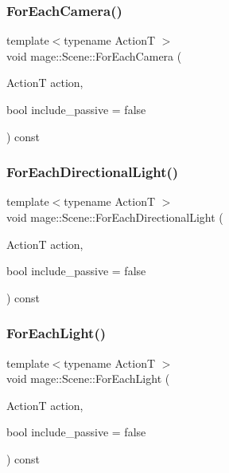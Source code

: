 \hypertarget{classmage_1_1_scene_a196159c991332f06faaee3c6ce0ff780}{}\label{classmage_1_1_scene_a196159c991332f06faaee3c6ce0ff780} 
\subsubsection{\texorpdfstring{For\+Each\+Camera()}{ForEachCamera()}}
{\footnotesize\ttfamily template$<$typename ActionT $>$ \\
void mage\+::\+Scene\+::\+For\+Each\+Camera (\begin{DoxyParamCaption}\item[{ActionT}]{action,  }\item[{bool}]{include\+\_\+passive = {\ttfamily false} }\end{DoxyParamCaption}) const}

\hypertarget{classmage_1_1_scene_ab1b4131911bf2457707fae459d999f85}{}\label{classmage_1_1_scene_ab1b4131911bf2457707fae459d999f85} 
\subsubsection{\texorpdfstring{For\+Each\+Directional\+Light()}{ForEachDirectionalLight()}}
{\footnotesize\ttfamily template$<$typename ActionT $>$ \\
void mage\+::\+Scene\+::\+For\+Each\+Directional\+Light (\begin{DoxyParamCaption}\item[{ActionT}]{action,  }\item[{bool}]{include\+\_\+passive = {\ttfamily false} }\end{DoxyParamCaption}) const}

\hypertarget{classmage_1_1_scene_a7ef0664366aa29c4dff89329d3fb5759}{}\label{classmage_1_1_scene_a7ef0664366aa29c4dff89329d3fb5759} 
\subsubsection{\texorpdfstring{For\+Each\+Light()}{ForEachLight()}}
{\footnotesize\ttfamily template$<$typename ActionT $>$ \\
void mage\+::\+Scene\+::\+For\+Each\+Light (\begin{DoxyParamCaption}\item[{ActionT}]{action,  }\item[{bool}]{include\+\_\+passive = {\ttfamily false} }\end{DoxyParamCaption}) const}

